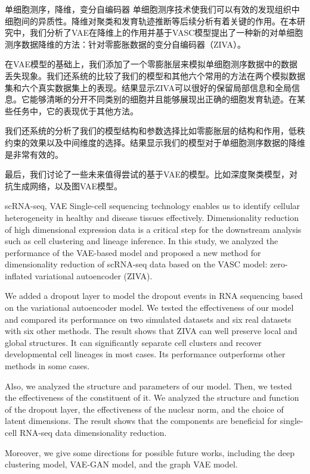 \begin{中文摘要}{单细胞测序，降维，变分自编码器}
  单细胞测序技术使我们可以有效的发现组织中细胞间的异质性。降维对聚类和发育轨迹推断等后续分析有着关键的作用。在本研究中，我们分析了VAE在降维上的作用并基于VASC模型提出了一种新的对单细胞测序数据降维的方法：针对零膨胀数据的变分自编码器（ZIVA）。
  
  在VAE模型的基础上，我们添加了一个零膨胀层来模拟单细胞测序数据中的数据丢失现象。我们还系统的比较了我们的模型和其他六个常用的方法在两个模拟数据集和六个真实数据集上的表现。结果显示ZIVA可以很好的保留局部信息和全局信息。它能够清晰的分开不同类别的细胞并且能够展现出正确的细胞发育轨迹。在某些任务中，它的表现优于其他方法。
  
  我们还系统的分析了我们的模型结构和参数选择比如零膨胀层的结构和作用，低秩约束的效果以及中间维度的选择。结果显示我们的模型对于单细胞测序数据的降维是非常有效的。
  
  最后，我们讨论了一些未来值得尝试的基于VAE的模型。比如深度聚类模型，对抗生成网络，以及图VAE模型。
\end{中文摘要}

\begin{英文摘要}{scRNA-seq, VAE}
  Single-cell sequencing technology enables us to identify cellular heterogeneity in healthy and disease tissues effectively. Dimensionality reduction of high dimensional expression data is a critical step for the downstream analysis such as cell clustering and lineage inference. In this study, we analyzed the performance of the VAE-based model and proposed a new method for dimensionality reduction of scRNA-seq data based on the VASC model: zero-inflated variational autoencoder (ZIVA).
  
  We added a dropout layer to model the dropout events in RNA sequencing based on the variational autoencoder model. We tested the effectiveness of our model and compared its performance on two simulated datasets and six real datasets with six other methods. The result shows that ZIVA can well preserve local and global structures. It can significantly separate cell clusters and recover developmental cell lineages in most cases. Its performance outperforms other methods in some cases. 
  
  Also, we analyzed the structure and parameters of our model. Then, we tested the effectiveness of the constituent of it. We analyzed the structure and function of the dropout layer, the effectiveness of the nuclear norm, and the choice of latent dimensions. The result shows that the components are beneficial for single-cell RNA-seq data dimensionality reduction.
  
  Moreover, we give some directions for possible future works, including the deep clustering model, VAE-GAN model, and the graph VAE model.
\end{英文摘要}
